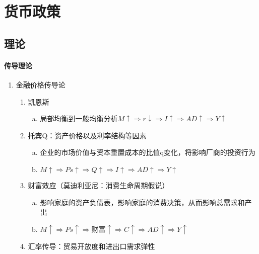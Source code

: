 \documentclass[12pt]{book}
\begin{document}
\chapter{货币政策}


\section{理论}



\subsubsection{传导理论}

\begin{enumerate}[1.]
  \item 金融价格传导论
        \begin{enumerate}[(1)]
          \item 凯恩斯
                \begin{enumerate}[a.]
                  \item 局部均衡到一般均衡分析$ M\uparrow \Rightarrow r\downarrow \Rightarrow I\uparrow \Rightarrow AD\uparrow \Rightarrow Y\uparrow  $
                \end{enumerate}
          \item 托宾Q：资产价格以及利率结构等因素
                \begin{enumerate}[a.]
                  \item 企业的市场价值与资本重置成本的比值q变化，将影响厂商的投资行为
                  \item $M\uparrow \Rightarrow Ps\uparrow \Rightarrow Q\uparrow \Rightarrow I\uparrow \Rightarrow AD\uparrow \Rightarrow Y\uparrow $
                \end{enumerate}
          \item 财富效应（莫迪利亚尼：消费生命周期假说）
                \begin{enumerate}[a.]
                  \item 影响家庭的资产负债表，影响家庭的消费决策，从而影响总需求和产出
                  \item $M\uparrow \Rightarrow Ps\uparrow\Rightarrow \text{财富}\uparrow\Rightarrow C\uparrow \Rightarrow AD\uparrow\Rightarrow Y\uparrow $
                \end{enumerate}
          \item 汇率传导：贸易开放度和进出口需求弹性
                \begin{enumerate}[a.]

\end{enumerate}
\end{enumerate}
\end{enumerate}
\end{document}
